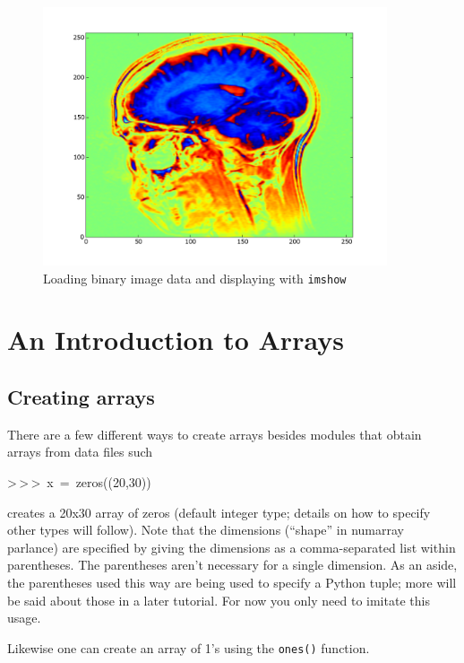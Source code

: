 %
\begin{figure}
\begin{centering}
\includegraphics[width=4in]{fig/hothead}
\par\end{centering}

\caption{\label{fig:array_hothead}Loading binary image data and displaying
with \texttt{imshow}}

\end{figure}



\section[Arrays]{An Introduction to Arrays}


\subsection{Creating arrays}

There are a few different ways to create arrays besides modules that
obtain arrays from data files such

\begin{lyxcode}
>\,{}>\,{}>~x~=~zeros((20,30))
\end{lyxcode}
creates a 20x30 array of zeros (default integer type; details on how
to specify other types will follow). Note that the dimensions ({}``shape''
in numarray parlance) are specified by giving the dimensions as a
comma-separated list within parentheses. The parentheses aren't necessary
for a single dimension. As an aside, the parentheses used this way
are being used to specify a Python tuple; more will be said about
those in a later tutorial. For now you only need to imitate this usage.

Likewise one can create an array of 1's using the \texttt{ones()}
function.

